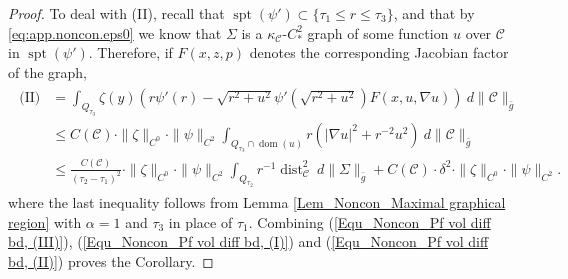 \documentclass[11pt, letterpaper, reqno]{amsart}
\numberwithin{equation}{section}
\theoremstyle{remark}
\newcommand{\cC}{\mathcal{C}}
\newcommand{\spt}{\operatorname{spt}}
\newcommand{\dist}{\operatorname{dist}}
\DeclareMathOperator{\Dom}{dom}
\begin{document}
\begin{proof}
     To deal with (II), recall that $\spt(\psi') \subset \{\tau_1 \leq r\leq \tau_3\}$, and that by \eqref{eq:app.noncon.eps0} we know that $\Sigma$ is a $\kappa_\cC$-$C^2_*$ graph of some function $u$ over $\cC$ in $\spt(\psi')$. Therefore, if $F(x, z, p)$ denotes the corresponding Jacobian factor of the graph,
     \begin{align}
     \begin{split}
       \text{(II)} & = \int_{Q_{\tau_3}} \zeta(y)\left(r \psi'(r) - \sqrt{r^2+u^2}\psi'(\sqrt{r^2+u^2}) F(x, u, \nabla u) \right)\ d\|\cC\|_{\bar g} \\
       & \leq C(\cC)\cdot\|\zeta\|_{C^0}\cdot \|\psi\|_{C^2} \int_{Q_{\tau_3}\cap \Dom(u)} r(|\nabla u|^2 + r^{-2}u^2)\ d\|\cC\|_{\bar g} \\
       & \leq \frac{C(\cC)}{(\tau_2-\tau_1)^2}\cdot\|\zeta\|_{C^0}\cdot \|\psi\|_{C^2} \int_{Q_{\tau_2}} r^{-1}\dist_\cC^2\ d\|\Sigma\|_{\bar g} + C(\cC)\cdot \delta^2 \cdot \|\zeta\|_{C^0}\cdot \|\psi\|_{C^2}.         
     \end{split} \label{Equ_Noncon_Pf vol diff bd, (II)}
     \end{align}
     where the last inequality follows from Lemma \ref{Lem_Noncon_Maximal graphical region} with $\alpha =1$ and $\tau_3$ in place of $\tau_1$. Combining (\ref{Equ_Noncon_Pf vol diff bd, (III)}), (\ref{Equ_Noncon_Pf vol diff bd, (I)}) and (\ref{Equ_Noncon_Pf vol diff bd, (II)}) proves the Corollary.
   \end{proof}
\end{document}
